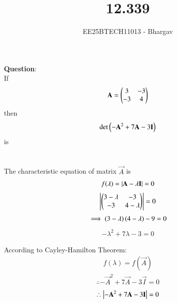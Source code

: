 \documentclass[journal]{IEEEtran}
\begin{document}

\vspace{3cm}

\title{12.339}
\author{EE25BTECH11013 - Bhargav}
\maketitle
    {\let\newpage\relax\maketitle}

\renewcommand{\thefigure}{\theenumi}
\renewcommand{\thetable}{\theenumi}
\setlength{\intextsep}{10pt} %

\renewcommand{\thetable}{\theenumi}

\textbf{Question}: \\
If
\begin{align}
\mathbf{A} = \begin{pmatrix}3 & -3 \\ -3 & 4\end{pmatrix}
\end{align}
then 
\begin{align}
\det{\ensuremath{\left(-\mathbf{A}^2 + 7\mathbf{A} - 3\mathbf{I}\right)}}
\end{align}
is \\ \\
\solution \\

The characteristic equation of matrix $\vec{A}$ is
\begin{align}
f(\lambda) = \left\vert\mathbf{A} - \lambda\mathbf{I}\right\vert = 0
\end{align}
\begin{align}
\left\vert\begin{pmatrix}3-\lambda & -3 \\ -3 & 4-\lambda\end{pmatrix}\right\vert = 0
\end{align}
\begin{align}
\implies \left(3-\lambda\right)\left(4-\lambda\right) - 9 = 0
\end{align}
\begin{align}
-\lambda^2 + 7\lambda -3 = 0
\end{align}

According to Cayley-Hamilton Theorem:
\begin{align}
f(\lambda) = f(\vec{A})
\end{align}
\begin{align}
\therefore -\vec{A}^2 + 7\vec{A} - 3\vec{I} = 0
\end{align}
\begin{align}
\therefore \left\vert-\mathbf{A}^2 + 7\mathbf{A} - 3\mathbf{I}\right\vert = 0
\end{align}
\end{document}
